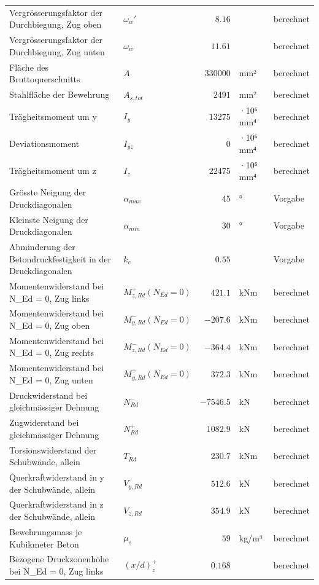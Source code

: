 \documentclass[11pt,a4paper]{article}
\begin{document}
\begin{xltabular}{\linewidth}{>{\raggedright\arraybackslash}Xlrll}
Vergrösserungsfaktor der Durchbiegung, Zug oben & $\omega_w'$ & $8.16$ &  & berechnet \\
Vergrösserungsfaktor der Durchbiegung, Zug unten & $\omega_w$ & $11.61$ &  & berechnet \\
Fläche des Bruttoquerschnitts & $A$ & $330000$ & mm² & berechnet \\
Stahlfläche der Bewehrung & $A_{s,tot}$ & $2491$ & mm² & berechnet \\
Trägheitsmoment um y & $I_y$ & $13275$ & ·10⁶ mm⁴ & berechnet \\
Deviationsmoment & $I_{yz}$ & $0$ & ·10⁶ mm⁴ & berechnet \\
Trägheitsmoment um z & $I_z$ & $22475$ & ·10⁶ mm⁴ & berechnet \\
Grösste Neigung der Druckdiagonalen & $\alpha_{max}$ & $45$ & ° & Vorgabe \\
Kleinste Neigung der Druckdiagonalen & $\alpha_{min}$ & $30$ & ° & Vorgabe \\
Abminderung der Betondruckfestigkeit in der Druckdiagonalen & $k_c$ & $0.55$ &  & Vorgabe \\
Momentenwiderstand bei N\_Ed = 0, Zug links & $M_{z,Rd}^{+}(N_{Ed} = 0)$ & $421.1$ & kNm & berechnet \\
Momentenwiderstand bei N\_Ed = 0, Zug oben & $M_{y,Rd}^{-}(N_{Ed} = 0)$ & $-207.6$ & kNm & berechnet \\
Momentenwiderstand bei N\_Ed = 0, Zug rechts & $M_{z,Rd}^{-}(N_{Ed} = 0)$ & $-364.4$ & kNm & berechnet \\
Momentenwiderstand bei N\_Ed = 0, Zug unten & $M_{y,Rd}^{+}(N_{Ed} = 0)$ & $372.3$ & kNm & berechnet \\
Druckwiderstand bei gleichmässiger Dehnung & $N_{Rd}^{-}$ & $-7546.5$ & kN & berechnet \\
Zugwiderstand bei gleichmässiger Dehnung & $N_{Rd}^{+}$ & $1082.9$ & kN & berechnet \\
Torsionswiderstand der Schubwände, allein & $T_{Rd}$ & $230.7$ & kNm & berechnet \\
Querkraftwiderstand in y der Schubwände, allein & $V_{y,Rd}$ & $512.6$ & kN & berechnet \\
Querkraftwiderstand in z der Schubwände, allein & $V_{z,Rd}$ & $354.9$ & kN & berechnet \\
Bewehrungsmass je Kubikmeter Beton & $\mu_s$ & $59$ & kg/m³ & berechnet \\
Bezogene Druckzonenhöhe bei N\_Ed = 0, Zug links & $\left(x/d\right)_{z}^{+}$ & $0.168$ &  & berechnet \\

\end{xltabular}
\end{document}
